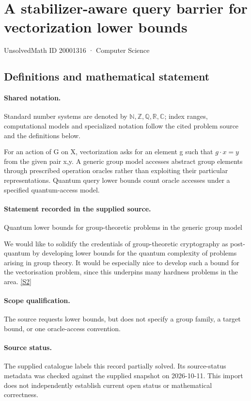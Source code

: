 \documentclass[11pt]{article}
\newcommand{\sref}[2]{\hyperlink{source:#1:#2}{[S#2]}}
\begin{document}
\setcounter{section}{20001315}
\section{A stabilizer-aware query barrier for vectorization lower bounds}\label{20001316}
{\small\sffamily UnsolvedMath ID 20001316 · Computer Science}
\subsection{Definitions and mathematical statement}

\paragraph{Shared notation.}Standard number systems are denoted by $\mathbb N,\mathbb Z,\mathbb Q,\mathbb R,\mathbb C$; index ranges, computational models and specialized notation follow the cited problem source and the definitions below.


For an action of G on X, vectorization asks for an element g such that $g\cdot x=y$ from the given pair x,y. A generic group model accesses abstract group elements through prescribed operation oracles rather than exploiting their particular representations. Quantum query lower bounds count oracle accesses under a specified quantum-access model.
\paragraph{Statement recorded in the supplied source.}
Quantum lower bounds for group-theoretic problems in the generic group model

We would like to solidify the credentials of group-theoretic cryptography as post-quantum by developing lower bounds for the quantum complexity of problems arising in group theory. It would be especially nice to develop such a bound for the vectorisation problem, since this underpins many hardness problems in the area. \sref{20001316}{2}
\paragraph{Scope qualification.}
The source requests lower bounds, but does not specify a group family, a target bound, or one oracle-access convention.
\paragraph{Source status.}
The supplied catalogue labels this record partially solved. Its source-status metadata was checked against the supplied snapshot on 2026-10-11. This import does not independently establish current open status or mathematical correctness.
\end{document}
